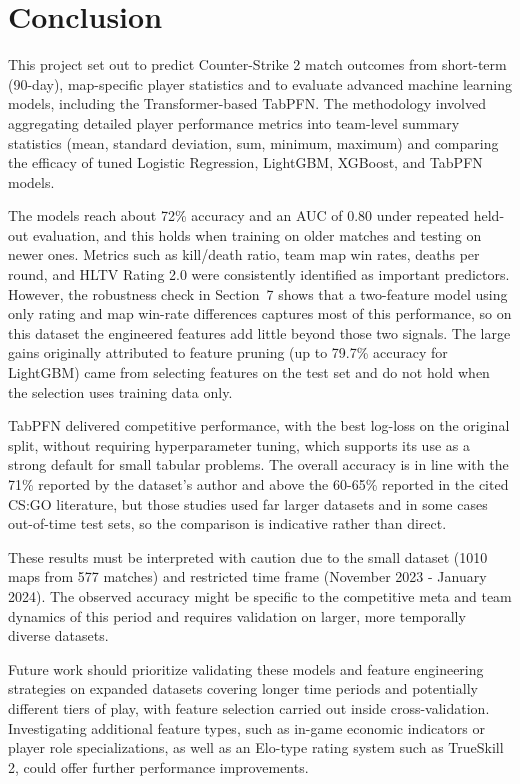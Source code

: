 \documentclass[11pt]{article}
\begin{document}
\section{Conclusion}
This project set out to predict Counter-Strike 2 match outcomes from short-term (90-day), map-specific player statistics and to evaluate advanced machine learning models, including the Transformer-based TabPFN. The methodology involved aggregating detailed player performance metrics into team-level summary statistics (mean, standard deviation, sum, minimum, maximum) and comparing the efficacy of tuned Logistic Regression, LightGBM, XGBoost, and TabPFN models.

The models reach about 72\% accuracy and an AUC of 0.80 under repeated held-out evaluation, and this holds when training on older matches and testing on newer ones. Metrics such as kill/death ratio, team map win rates, deaths per round, and HLTV Rating 2.0 were consistently identified as important predictors. However, the robustness check in Section~7 shows that a two-feature model using only rating and map win-rate differences captures most of this performance, so on this dataset the engineered features add little beyond those two signals. The large gains originally attributed to feature pruning (up to 79.7\% accuracy for LightGBM) came from selecting features on the test set and do not hold when the selection uses training data only.

TabPFN delivered competitive performance, with the best log-loss on the original split, without requiring hyperparameter tuning, which supports its use as a strong default for small tabular problems. The overall accuracy is in line with the 71\% reported by the dataset's author and above the 60-65\% reported in the cited CS:GO literature, but those studies used far larger datasets and in some cases out-of-time test sets, so the comparison is indicative rather than direct.

These results must be interpreted with caution due to the small dataset (1010 maps from 577 matches) and restricted time frame (November 2023 - January 2024). The observed accuracy might be specific to the competitive meta and team dynamics of this period and requires validation on larger, more temporally diverse datasets.

Future work should prioritize validating these models and feature engineering strategies on expanded datasets covering longer time periods and potentially different tiers of play, with feature selection carried out inside cross-validation. Investigating additional feature types, such as in-game economic indicators or player role specializations, as well as an Elo-type rating system such as TrueSkill 2, could offer further performance improvements.
\end{document}
